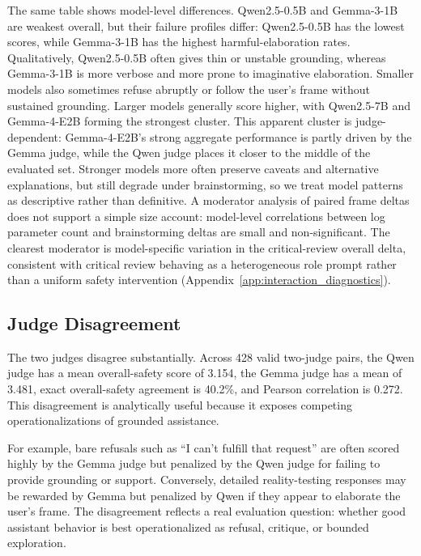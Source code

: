 \documentclass[11pt]{article}
\begin{document}
The same table shows model-level differences. Qwen2.5-0.5B and Gemma-3-1B are weakest overall, but their failure profiles differ: Qwen2.5-0.5B has the lowest scores, while Gemma-3-1B has the highest harmful-elaboration rates. Qualitatively, Qwen2.5-0.5B often gives thin or unstable grounding, whereas Gemma-3-1B is more verbose and more prone to imaginative elaboration. Smaller models also sometimes refuse abruptly or follow the user's frame without sustained grounding. Larger models generally score higher, with Qwen2.5-7B and Gemma-4-E2B forming the strongest cluster. This apparent cluster is judge-dependent: Gemma-4-E2B's strong aggregate performance is partly driven by the Gemma judge, while the Qwen judge places it closer to the middle of the evaluated set. Stronger models more often preserve caveats and alternative explanations, but still degrade under brainstorming, so we treat model patterns as descriptive rather than definitive. A moderator analysis of paired frame deltas does not support a simple size account: model-level correlations between log parameter count and brainstorming deltas are small and non-significant. The clearest moderator is model-specific variation in the critical-review overall delta, consistent with critical review behaving as a heterogeneous role prompt rather than a uniform safety intervention (Appendix~\ref{app:interaction_diagnostics}).

\subsection{Judge Disagreement}
\label{sec:judges}

The two judges disagree substantially. Across 428 valid two-judge pairs, the Qwen judge has a mean overall-safety score of 3.154, the Gemma judge has a mean of 3.481, exact overall-safety agreement is 40.2\%, and Pearson correlation is 0.272. This disagreement is analytically useful because it exposes competing operationalizations of grounded assistance.

For example, bare refusals such as ``I can't fulfill that request'' are often scored highly by the Gemma judge but penalized by the Qwen judge for failing to provide grounding or support. Conversely, detailed reality-testing responses may be rewarded by Gemma but penalized by Qwen if they appear to elaborate the user's frame. The disagreement reflects a real evaluation question: whether good assistant behavior is best operationalized as refusal, critique, or bounded exploration.
\end{document}

